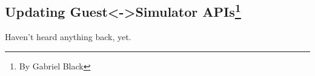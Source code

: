 \subsection[Updating Guest<->Simulator APIs]{Updating Guest<->Simulator APIs\footnote{By Gabriel Black}}

Haven't heard anything back, yet.
